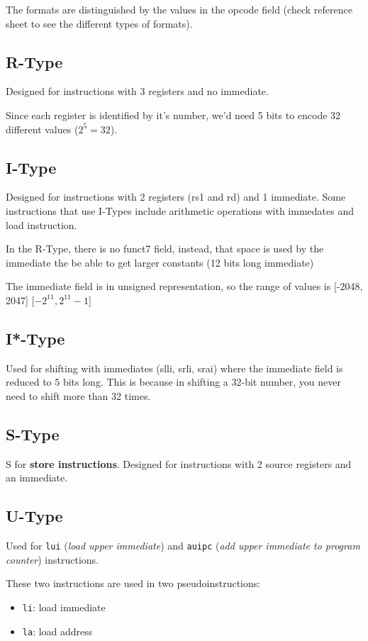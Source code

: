 \documentclass[12pt]{article}
\begin{document}
The formats are distinguished by the values in the opcode field (check reference sheet to see the different types of formats).

\subsection*{R-Type}
Designed for instructions with 3 registers and no immediate.

Since each register is identified by it's number, we'd need 5 bits to encode 32 different values ($2^5 = 32$).


\subsection*{I-Type}
Designed for instructions with 2 registers (rs1 and rd) and 1 immediate.
Some instructions that use I-Types include arithmetic operations with immedates and load instruction.

In the R-Type, there is no funct7 field, instead, that space is used by the immediate the be able to get larger constants (12 bits long immediate)

The immediate field is in unsigned representation, so the range of values is [-2048, 2047] [$-2^{11}, 2^{11} - 1$]

\subsection*{I*-Type}
Used for shifting with immediates (slli, srli, srai) where the immediate field is reduced to 5 bits long. This is because in shifting a 32-bit number, you never need to shift more than 32 times.

\subsection*{S-Type}
S for \textbf{store instructions}. Designed for instructions with 2 source registers and an immediate.


\subsection*{U-Type}
Used for \lstinline{lui} (\emph{load upper immediate}) and \lstinline{auipc} (\emph{add upper immediate to program counter}) instructions.

These two instructions are used in two pseudoinstructions:
\begin{itemize}
    \item \lstinline{li}: load immediate
    \item \lstinline{la}: load address
\end{itemize}
\end{document}

